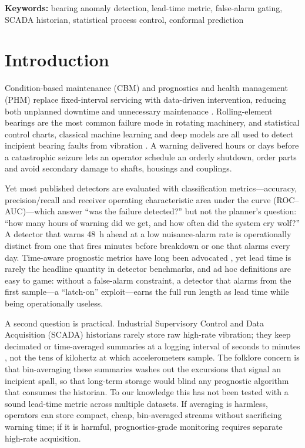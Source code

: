 \documentclass[IJPHM, 2026, 0]{PHMSociety}
\begin{document}
\newpage
\noindent\textbf{Keywords:} bearing anomaly detection, lead-time metric, false-alarm gating, SCADA historian, statistical process control, conformal prediction
\medskip

\section{Introduction}
\label{sec:intro}
Condition-based maintenance (CBM) and prognostics and health management (PHM) replace fixed-interval servicing with data-driven intervention, reducing both unplanned downtime and unnecessary maintenance \cite{jardine2006review,lee2014prognostics,lei2018machinery}. Rolling-element bearings are the most common failure mode in rotating machinery, and statistical control charts, classical machine learning and deep models are all used to detect incipient bearing faults from vibration \cite{randall2011rolling,zhao2019deep}. A warning delivered hours or days before a catastrophic seizure lets an operator schedule an orderly shutdown, order parts and avoid secondary damage to shafts, housings and couplings.

Yet most published detectors are evaluated with classification metrics---accuracy, precision/recall and receiver operating characteristic area under the curve (ROC--AUC)---which answer ``was the failure detected?'' but not the planner's question: ``how many hours of warning did we get, and how often did the system cry wolf?'' A detector that warns 48~h ahead at a low nuisance-alarm rate is operationally distinct from one that fires minutes before breakdown or one that alarms every day. Time-aware prognostic metrics have long been advocated \cite{saxena2008metrics,saxena2010metrics,goebel2011comparison}, yet lead time is rarely the headline quantity in detector benchmarks, and ad hoc definitions are easy to game: without a false-alarm constraint, a detector that alarms from the first sample---a ``latch-on'' exploit---earns the full run length as lead time while being operationally useless.

A second question is practical. Industrial Supervisory Control and Data Acquisition (SCADA) historians rarely store raw high-rate vibration; they keep decimated or time-averaged summaries at a logging interval of seconds to minutes \cite{tautzweinert2017using}, not the tens of kilohertz at which accelerometers sample. The folklore concern is that bin-averaging these summaries washes out the excursions that signal an incipient spall, so that long-term storage would blind any prognostic algorithm that consumes the historian. To our knowledge this has not been tested with a sound lead-time metric across multiple datasets. If averaging is harmless, operators can store compact, cheap, bin-averaged streams without sacrificing warning time; if it is harmful, prognostics-grade monitoring requires separate high-rate acquisition.
\end{document}
